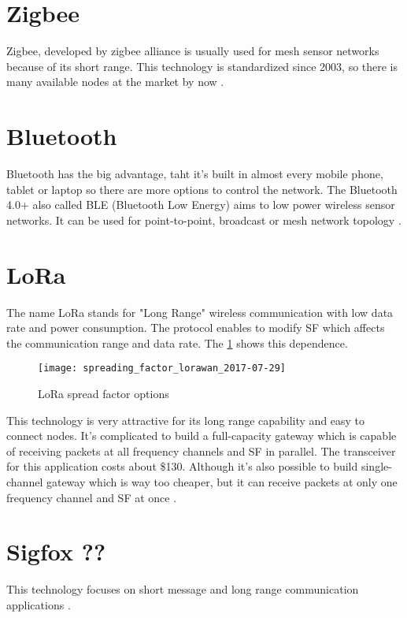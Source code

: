 \section{Zigbee}
Zigbee, developed by zigbee alliance is usually used for mesh sensor networks because of its short range. This technology is standardized since 2003, so there is many available nodes at the market by now \cite{10} \cite{11} \cite{12}.

\section{Bluetooth}
Bluetooth has the big advantage, taht it's built in almost every mobile phone, tablet or laptop so there are more options to control the network. The Bluetooth 4.0+ also called BLE (Bluetooth Low Energy) aims to low power wireless sensor networks.
It can be used for point-to-point, broadcast or mesh network topology \cite{13} \cite{14} \cite{15} \cite{16}.


\section{LoRa}
The name LoRa stands for "Long Range" wireless communication with low data rate and power consumption. The protocol enables to modify SF which affects the communication range and data rate. The \ref{fig:loraSF} shows this dependence.

\begin{figure}[!h]
    \centering
    \texttt{[image: spreading\_factor\_lorawan\_2017-07-29]}
    \caption{LoRa spread factor options \cite{24}}
    \label{fig:loraSF}
\end{figure}

This technology is very attractive for its long range capability and easy to connect nodes. It's complicated to build a full-capacity gateway which is capable of receiving packets at all frequency channels and SF in parallel. The transceiver for this application costs about \$130. Although it's also possible to build single-channel gateway which is way too cheaper, but it can receive packets at only one frequency channel and SF at once \cite{17} \cite{18} \cite{19} \cite{20} \cite{21} \cite{22} \cite{23} \cite{24}.


\section{Sigfox ??}
This technology focuses on short message and long range communication applications \cite{25} \cite{26}.


